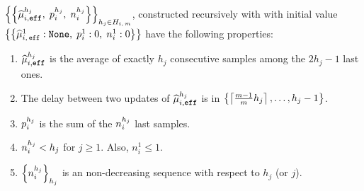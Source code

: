 \begin{proposition}
\label{prop:effu}
 $\left\{\left\{  \widehat{\mu}_{i,\texttt{\footnotesize{eff}}}^{h_j},\; p_i^{h_j}, \; n_i^{h_j} \right\}\right\}_{h_j \in H_{i,\,m}}$, constructed recursively with \EFF with initial value $\left\{\left\{  \widehat{\mu}_{i,\,\normalfont{\texttt{eff}}}^1 : \texttt{None},\; p_i^{1} :0 , \; n_i^{1}:0 \right\}\right\}$ have the following properties:
 \begin{enumerate}[topsep=0pt]
  \item $\widehat{\mu}_{i,\texttt{\footnotesize{eff}}}^{h_j}$ is the average of exactly $h_j$ consecutive samples among the $2h_j -1$ last ones. \label{list:effu-hmu}
  \item The delay between two updates of $\widehat{\mu}_{i,\texttt{\footnotesize{eff}}}^{h_j}$ is in $\left\{\left\lceil\frac{m-1}{m} h_j\right\rceil, \dots, h_j -1\right\}$.\label{list:effu-delay}
  \item $p_i^{h_j}$ is the sum of the $n_i^{h_j}$ last samples. \label{list:effu-p}
  \item $n_i^{h_j} < h_j$ for $j\geq 1$. Also, $n_i^1 \leq 1$.\label{list:effu-n1}
  \item $\left\{ n_i^{h_j} \right\}_{h_j}$ is an non-decreasing sequence with respect to $h_j$ (or $j$).\label{list:effu-n2}
 \end{enumerate}
\end{proposition}
